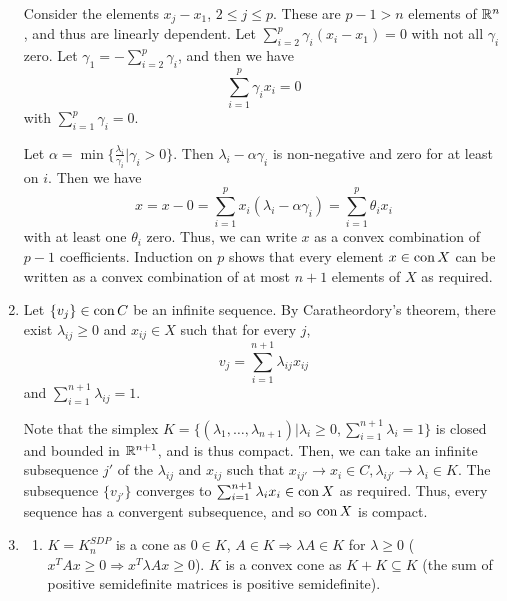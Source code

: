 \begin{enumerate}[label*=Ex \arabic*.]
  Consider the elements $x_{j} - x_{1}$, $2 \leq j \leq p$.  These are
  $p - 1 > n$ elements of $\mathbb{R}^{n}$, and thus are linearly dependent.
  Let $\sum_{i=2}^{p} \gamma_{i} (x_{i} - x_{1}) = 0$ with not all
  $\gamma_{i}$ zero.  Let $\gamma_{1} = - \sum_{i=2}^{p} \gamma_{i}$,
  and then we have
  \begin{equation}
    \label{eq:27}
    \sum_{i=1}^{p} \gamma_{i} x_{i} = 0
  \end{equation} with $\sum_{i=1}^{p} \gamma_{i} = 0$.

  Let $\alpha = \min \{ \frac{\lambda_{i}}{\gamma_{i}} | \gamma_{i} >
  0 \}$. Then $\lambda_{i} - \alpha \gamma_{i}$ is non-negative and
  zero for at least on $i$. Then we have
  \begin{equation}
    \label{eq:28}
    x = x - 0 = \sum_{i=1}^{p} x_{i} (\lambda_{i} - \alpha
    \gamma_{i}) = \sum_{i=1}^{p} \theta_{i} x_{i}  
  \end{equation}
  with at least one $\theta_{i}$ zero. Thus, we can write $x$ as a
  convex combination of $p - 1$ coefficients. Induction on $p$ shows
  that every element $x \in \operatorname*{con} X$ can be written as a convex
  combination of at most $n+1$ elements of $X$ as required.
\item \label{item:9} Let $\{ v_{j} \} \in \operatorname*{con} C$ be an infinite
  sequence. By Caratheordory's theorem, there exist $\lambda_{ij} \geq
  0$ and $x_{ij} \in X$ such that for every $j$,
  \begin{equation}
    \label{eq:3}
    v_{j} = \sum_{i=1}^{n+1} \lambda_{ij} x_{ij}
  \end{equation} and $\sum_{i=1}^{n+1} \lambda_{ij} = 1$.

  Note that the simplex $K = \{ (\lambda_{1}, \dots, \lambda_{n+1}) |
  \lambda_{i} \geq 0, \sum_{i=1}^{n+1} \lambda_{i} = 1 \}$ is closed
  and bounded in $\mathbb{R}^{n+1}$, and is thus compact. Then, we can take an
  infinite subsequence $j'$ of the $\lambda_{ij}$ and $x_{ij}$ such
  that $x_{ij'} \rightarrow x_{i} \in C, \lambda_{ij'} \rightarrow
  \lambda_{i} \in K$. The subsequence $\{ v_{j'} \}$ converges to
  $\sum_{i=1}^{n+1} \lambda_{i} x_{i} \in \operatorname*{con} X$ as required. Thus,
  every sequence has a convergent subsequence, and so $\operatorname*{con} X$ is
  compact.
\item \label{item:10}
  \begin{enumerate}
  \item $K = K_{n}^{SDP}$ is a cone as $0 \in K$, $A \in K \Rightarrow \lambda A \in
    K$ for $\lambda \geq 0$ ($x^{T}Ax \geq 0 \Rightarrow x^{T} \lambda
    A x \geq 0$). $K$ is a convex cone as $K + K \subseteq K$ (the sum of
    positive semidefinite matrices is positive semidefinite).


\end{enumerate}
\end{enumerate}
